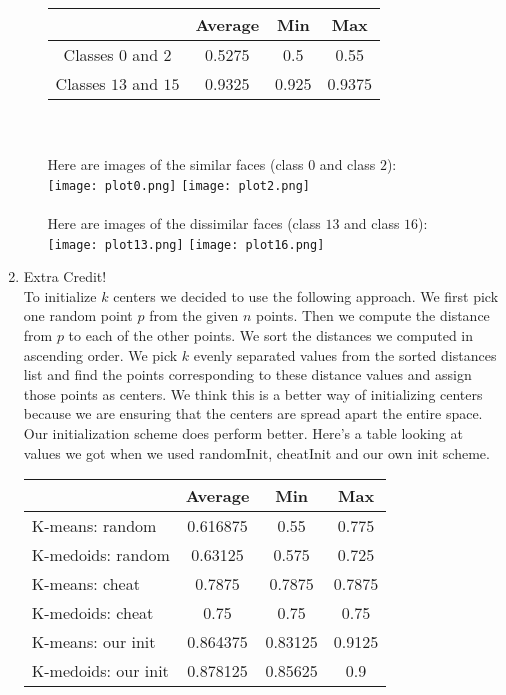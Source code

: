 \documentclass[11pt]{article}
\begin{document}
\begin{enumerate}[1]
\begin{enumerate}[(a)]
 \begin{tabular}{| c | c | c | c |}
  \hline		
   & Average & Min & Max \\
  \hline
  Classes $0$ and $2$ & 0.5275 & 0.5 & 0.55 \\
  Classes $13$ and $15$ & 0.9325 & 0.925 & 0.9375   \\
  \hline
\end{tabular}\\ \\
\newpage
Here are images of the similar faces (class $0$ and class $2$): \\
\texttt{[image: plot0.png]} \hspace*{5em}
\texttt{[image: plot2.png]} \\  \\
Here are images of the dissimilar faces (class $13$ and class $16$): \\
\texttt{[image: plot13.png]}  \hspace*{5em}
\texttt{[image: plot16.png]} \\
\end{enumerate}
\item Extra Credit! \\
To initialize $k$ centers we decided to use the following approach. We first pick one random point $p$ from the given $n$ points. Then we compute the distance from $p$ to each of the other points. We sort the distances we computed in ascending order. We pick $k$ evenly separated values from the sorted distances list and find the points corresponding to these distance values and assign those points as centers. We think this is a better way of initializing centers because we are ensuring that the centers are spread apart the entire space. \\
Our initialization scheme does perform better. Here's a table looking at values we got when we used randomInit, cheatInit and our own init scheme. \\
 \begin{tabular}{| l | c | c | c |}
  \hline		
   & Average & Min & Max \\
  \hline
K-means: random & 0.616875 & 0.55 & 0.775 \\
  K-medoids: random & 0.63125 & 0.575 & 0.725   \\
K-means: cheat & 0.7875 & 0.7875 & 0.7875 \\
  K-medoids: cheat  & 0.75 & 0.75 & 0.75   \\
K-means: our init & 0.864375 & 0.83125 & 0.9125 \\
  K-medoids: our init  & 0.878125 & 0.85625 & 0.9   \\
  \hline
\end{tabular}

 \end{enumerate}
\end{document}
